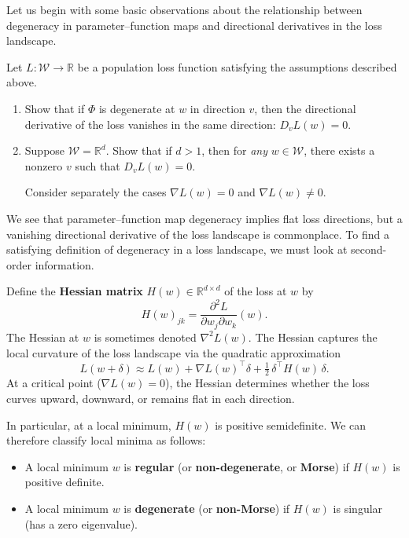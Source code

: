\documentclass[11pt]{article}
\newcommand{\R}{\mathbb{R}}
\newcommand{\W}{\mathcal{W}}
\begin{document}
Let us begin with some basic observations about the relationship between degeneracy
in parameter--function maps and directional derivatives in the loss landscape.

\begin{exercise}
\label{ex:loss-basic}
Let $L : \W \to \R$ be a population loss function satisfying the assumptions described above.
\begin{enumerate}
    \item
        Show that if $\Phi$ is degenerate at $w$ in direction $v$, then the
        directional derivative of the loss vanishes in the same direction:
        $D_v L(w) = 0$.
    \item
        Suppose $\W = \R^d$. Show that if $d > 1$, then for \emph{any} $w \in \W$, there exists a nonzero $v$
        such that $D_v L(w) = 0$. \begin{hint}
Consider separately the cases $\nabla
        L(w) = 0$ and $\nabla L(w) \neq 0$.
        \end{hint}
\end{enumerate}
\end{exercise}

We see that parameter--function map degeneracy implies flat loss directions,
but a vanishing directional derivative of the loss landscape is commonplace. To
find a satisfying definition of degeneracy in a loss landscape, we must look at
second-order information.

Define the \textbf{Hessian matrix} $H(w) \in \R^{d \times d}$ of the loss at
$w$ by
\begin{equation}
    H(w)_{jk} = \frac{\partial^2 L}{\partial w_j \partial w_k}(w).
\end{equation}
The Hessian at $w$ is sometimes denoted $\nabla^2 L(w)$.
The Hessian captures the local curvature of the loss landscape via the
quadratic approximation
\begin{equation}
    L(w + \delta)
    \approx L(w)
    + \nabla L(w)^\top \delta
    + \tfrac{1}{2}\,\delta^\top H(w)\, \delta.
\end{equation}
At a critical point ($\nabla L(w) = 0$), the Hessian determines whether the
loss curves upward, downward, or remains flat in each direction.

In particular, at a local minimum, $H(w)$ is positive semidefinite. We can
therefore classify local minima as follows:
\begin{itemize}
    \item A local minimum $w$ is \textbf{regular} (or \textbf{non-degenerate},
        or \textbf{Morse}) if $H(w)$ is positive definite.
    \item A local minimum $w$ is \textbf{degenerate} (or \textbf{non-Morse}) if
        $H(w)$ is singular (has a zero eigenvalue).
\end{itemize}
\end{document}
